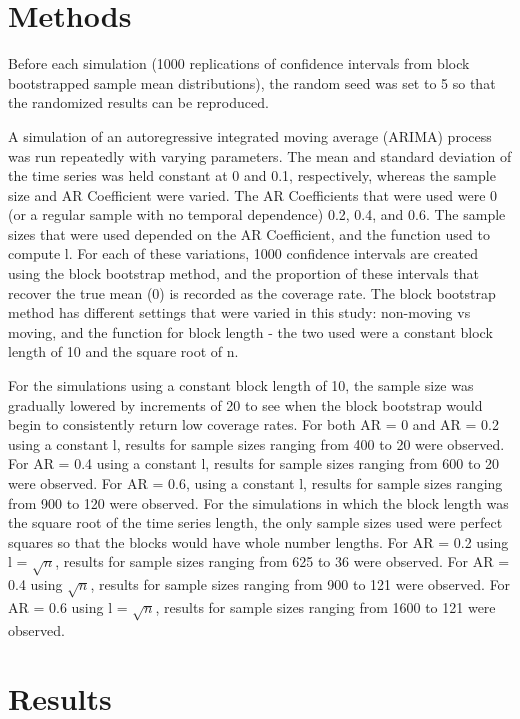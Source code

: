 \documentclass[12pt, letterpaper, titlepage]{article}
\begin{document}
\section{Methods}
\label{sec:methods}

Before each simulation (1000 replications of confidence intervals from block bootstrapped sample mean distributions), the random seed was set to 5 so that the randomized results can be 
reproduced. 

A simulation of an autoregressive integrated moving average (ARIMA) process was run 
repeatedly with varying parameters. 
The mean and standard deviation of the time series was held constant at 0 and 0.1, respectively, whereas 
the sample size and AR Coefficient
 were varied. The AR Coefficients that were used were 0 (or a regular sample with no temporal dependence) 0.2, 0.4, and 0.6. The sample sizes 
 that were used depended on the AR
 Coefficient, and the function used to compute l. For each of these variations, 1000 
 confidence intervals are created using
 the block bootstrap method, and the proportion of these intervals that recover the true 
 mean (0) is recorded as the coverage
 rate. The block bootstrap method has different settings that were varied in this study: 
 non-moving vs moving, 
and the function for block length - the two used were a constant block length of 10 and 
the square root of n.

For the simulations using a constant block length of 10, the sample size was gradually 
lowered by increments of 20 to see when
the block bootstrap would begin to consistently return low coverage rates. For both AR = 0 and AR = 0.2 
using a constant l, results for
sample sizes ranging from 400 to 20 were observed. For AR = 0.4 using a constant l, 
results for sample sizes ranging from 600
to 20 were observed. For AR = 0.6, using a constant l, results for sample sizes ranging 
from 900 to 120 were observed. For the simulations in which the block length was the 
square root of the time series length, the only sample sizes used were perfect squares so 
that the blocks would have whole number lengths. For AR = 0.2 using l = $\sqrt{n}$, results 
for sample sizes ranging from 625 to 36 were observed. For AR = 0.4 using $\sqrt{n}$, results 
for sample sizes ranging from 900 to 121 were observed. For AR = 0.6 using l = $\sqrt{n}$, 
results for sample sizes ranging from 1600 to 121 were observed. 

\section{Results}
\label{sec:results}
\end{document}
